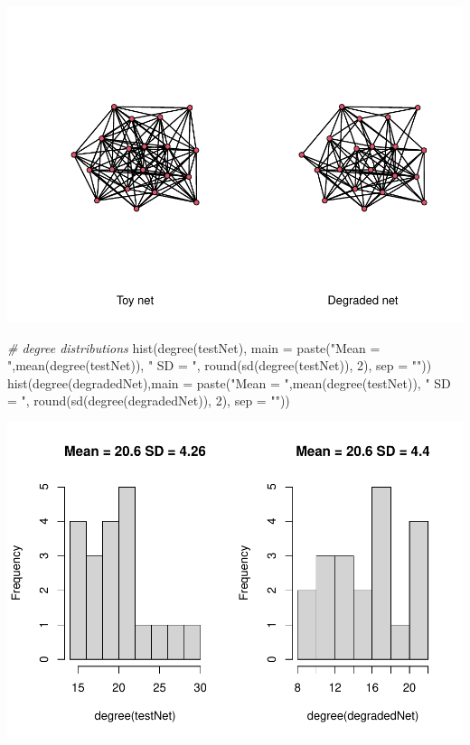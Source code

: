 \documentclass[
]{article}
\newenvironment{Shaded}{\begin{snugshade}}{\end{snugshade}}
\newcommand{\AttributeTok}[1]{\textcolor[rgb]{0.77,0.63,0.00}{#1}}
\newcommand{\CommentTok}[1]{\textcolor[rgb]{0.56,0.35,0.01}{\textit{#1}}}
\newcommand{\DecValTok}[1]{\textcolor[rgb]{0.00,0.00,0.81}{#1}}
\newcommand{\FunctionTok}[1]{\textcolor[rgb]{0.00,0.00,0.00}{#1}}
\newcommand{\NormalTok}[1]{#1}
\newcommand{\StringTok}[1]{\textcolor[rgb]{0.31,0.60,0.02}{#1}}
\begin{document}
\includegraphics{20220404_miss_data_model_files/figure-latex/MCAR-1.pdf}

\begin{Shaded}
\begin{Highlighting}[]
\CommentTok{\# degree distributions}
\FunctionTok{hist}\NormalTok{(}\FunctionTok{degree}\NormalTok{(testNet), }\AttributeTok{main =} \FunctionTok{paste}\NormalTok{(}\StringTok{"Mean = "}\NormalTok{,}\FunctionTok{mean}\NormalTok{(}\FunctionTok{degree}\NormalTok{(testNet)), }\StringTok{" SD = "}\NormalTok{, }\FunctionTok{round}\NormalTok{(}\FunctionTok{sd}\NormalTok{(}\FunctionTok{degree}\NormalTok{(testNet)), }\DecValTok{2}\NormalTok{), }\AttributeTok{sep =} \StringTok{""}\NormalTok{))}
\FunctionTok{hist}\NormalTok{(}\FunctionTok{degree}\NormalTok{(degradedNet),}\AttributeTok{main =} \FunctionTok{paste}\NormalTok{(}\StringTok{"Mean = "}\NormalTok{,}\FunctionTok{mean}\NormalTok{(}\FunctionTok{degree}\NormalTok{(testNet)), }\StringTok{" SD = "}\NormalTok{, }\FunctionTok{round}\NormalTok{(}\FunctionTok{sd}\NormalTok{(}\FunctionTok{degree}\NormalTok{(degradedNet)), }\DecValTok{2}\NormalTok{), }\AttributeTok{sep =} \StringTok{""}\NormalTok{))}
\end{Highlighting}
\end{Shaded}

\includegraphics{20220404_miss_data_model_files/figure-latex/MCAR-2.pdf}
\end{document}
